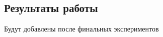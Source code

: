 \documentclass[14pt]{matmex-diploma-custom}
\begin{document}
\begin{appendices}
\section{Результаты работы}

Будут добавлены после финальных экспериментов

\end{appendices}
\end{document}
